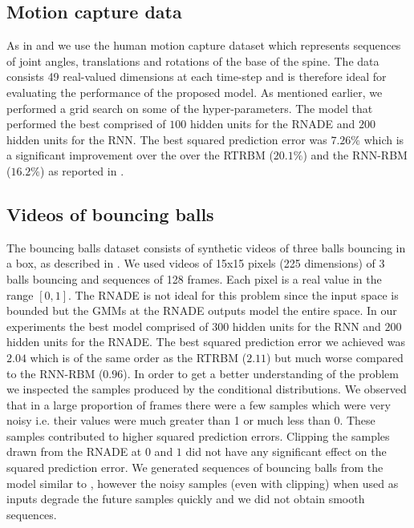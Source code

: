 \documentclass{article} %
\begin{document}
\subsection{Motion capture data}
As in \cite{Sutskever2008} and \cite{Boulanger-Lewandowski2012} we use the human motion capture dataset which represents sequences of joint angles, translations and rotations of the base of the spine. The data consists 49 real-valued dimensions at each time-step and is therefore ideal for evaluating the performance of the proposed model. As mentioned earlier, we performed a grid search on some of the hyper-parameters. The model that performed the best comprised of $100$ hidden units for the RNADE and $200$ hidden units for the RNN. The best squared prediction error was $\mathbf{7.26\%}$ which is a significant improvement over the over the RTRBM ($20.1\%$) and the RNN-RBM ($16.2\%$) as reported in \cite{Boulanger-Lewandowski2012}. 

\subsection{Videos of bouncing balls}
The bouncing balls dataset consists of synthetic videos of three balls bouncing in a box, as described in \cite{Sutskever2008}. We used videos of 15x15 pixels (225 dimensions) of 3 balls bouncing and sequences of 128 frames. Each pixel is a real value in the range $[0,1]$. The RNADE is not ideal for this problem since the input space is bounded but the GMMs at the RNADE outputs model the entire space. In our experiments the best model comprised of $300$ hidden units for the RNN and $200$ hidden units for the RNADE. The best squared prediction error we achieved was $2.04$ which is of the same order as the RTRBM ($2.11$) but much worse compared to the RNN-RBM ($0.96$). In order to get a better understanding of the problem we inspected the samples produced by the conditional distributions. We observed that in a large proportion of frames there were a few samples which were very noisy i.e. their values were much greater than 1 or much less than 0. These samples contributed to higher squared prediction errors. Clipping the samples drawn from the RNADE at $0$ and $1$ did not have any significant effect on the squared prediction error. We generated sequences of bouncing balls from the model similar to \cite{Sutskever2008}, however the noisy samples (even with clipping) when used as inputs degrade the future samples quickly and we did not obtain smooth sequences. 
\end{document}
